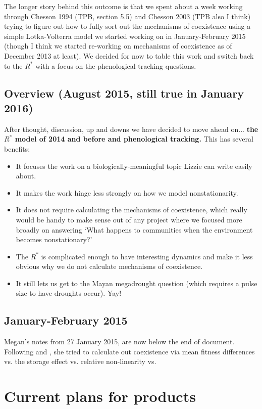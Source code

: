 \documentclass[11pt,a4paper,oneside]{article}
\newenvironment{smitemize}{
\begin{itemize}
  \setlength{\itemsep}{1pt}
  \setlength{\parskip}{0pt}
  \setlength{\parsep}{0pt}}
{\end{itemize}
}
\begin{document}
\noindent The longer story behind this outcome is that we spent about a week working through Chesson 1994 (TPB, section 5.5) and Chesson 2003 (TPB also I think) trying to figure out how to fully sort out the mechanisms of coexistence using a simple Lotka-Volterra model we started working on in January-February 2015 (though I think we started re-working on mechanisms of coexistence as of December 2013 at least). We decided for now to table this work and switch back to the $R^*$ with a focus on the phenological tracking questions. 

\subsection{Overview (August 2015, still true in January 2016)}
After thought, discussion, up and downs we have decided to move ahead
on... {\bf the $R^*$ model of 2014 and before and phenological
  tracking.} This has several benefits:
\begin{smitemize}
\item It focuses the work on a biologically-meaningful topic Lizzie
  can write easily about.
\item It makes the work hinge less strongly on how we model
  nonstationarity.
\item It does not require calculating the mechanisms of coexistence,
  which really would be handy to make sense out of any project where
  we focused more broadly on answering `What happens to communities when the environment
  becomes nonstationary?'
\item The $R^*$ is complicated enough to have interesting dynamics and
  make it less obvious why we do not calculate mechanisms of
  coexistence.
\item It still lets us get to the Mayan megadrought question (which
  requires a pulse size to have droughts occur). Yay!
\end{smitemize}

\subsection{January-February 2015}
Megan's notes from 27 January 2015, are now below the end of document. Following \citet{chesson2003} and \citet{godoy2014}, she tried to calculate out coexistence via mean fitness differences vs. the storage effect vs. relative non-linearity vs. 

\newpage
\section{Current plans for products}
\end{document}
